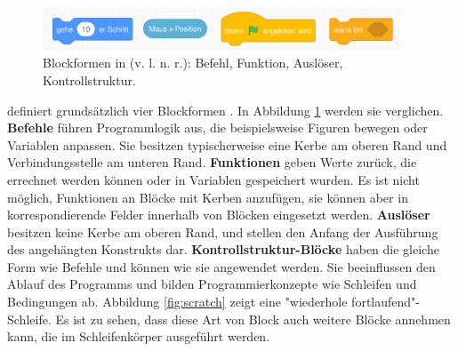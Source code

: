 \begin{figure}
  \begin{center}
    \includegraphics[width=0.95\textwidth]{assets/scratch-blocks.png}
  \end{center}
  \caption{Blockformen in \Scratch{} (v. l. n. r.): Befehl, Funktion, Auslöser, Kontrollstruktur. }
  \label{fig:scratch-blocks}
\end{figure}

\Scratch{} definiert grundsätzlich vier Blockformen \parencite{maloneyScratchProgramming2010}. In Abbildung \ref{fig:scratch-blocks} werden sie verglichen. \textbf{Befehle} führen Programmlogik aus, die beispielsweise Figuren bewegen oder Variablen anpassen. Sie besitzen typischerweise eine Kerbe am oberen Rand und Verbindungsstelle am unteren Rand. \textbf{Funktionen} geben Werte zurück, die errechnet werden können oder in Variablen gespeichert wurden. Es ist nicht möglich, Funktionen an Blöcke mit Kerben anzufügen, sie können aber in korrespondierende Felder innerhalb von Blöcken eingesetzt werden. \textbf{Auslöser} besitzen keine Kerbe am oberen Rand, und stellen den Anfang der Ausführung des angehängten Konstrukts dar. \textbf{Kontrollstruktur-Blöcke} haben die gleiche Form wie Befehle und können wie sie angewendet werden. Sie beeinflussen den Ablauf des Programms und bilden Programmierkonzepte wie Schleifen und Bedingungen ab. Abbildung \ref{fig:scratch} zeigt eine "wiederhole fortlaufend"-Schleife. Es ist zu sehen, dass diese Art von Block auch weitere Blöcke annehmen kann, die im Schleifenkörper ausgeführt werden.
\parencite{maloneyScratchProgramming2010}

